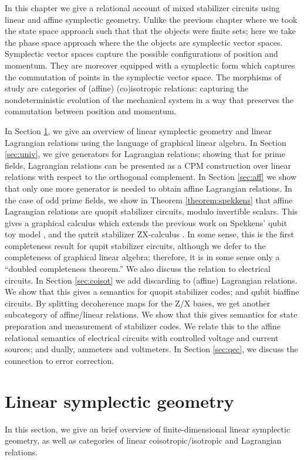 
In this chapter we  give a relational account of mixed stabilizer circuits using linear and affine symplectic geometry.
Unlike the previous chapter where we took the state space approach such that  that the objects were finite sets; here we take the phase space approach where the the objects are symplectic vector spaces.  Symplectic vector spaces capture the possible configurations of position and momentum.  They are moreover equipped with a symplectic form which captures the commutation of points in the symplectic vector space. The morphisms of study  are categories of (affine) (co)isotropic relations: capturing the nondeterministic evolution of the mechanical system in a way that preserves the commutation between position and momentum.

In Section \ref{sec:sym}, we give an overview of linear symplectic geometry and  linear Lagrangian relations using the language of graphical linear algebra. In Section \ref{sec:univ}, we give generators for Lagrangian relations; showing that for prime fields, Lagrangian relations can be presented as a CPM construction over linear relations with respect to the orthogonal complement.
In Section \ref{sec:aff} we show that only one more generator is needed to obtain affine Lagrangian relations.  In the case of odd prime fields, we show in Theorem \ref{theorem:spekkens} that affine Lagrangian relations are quopit stabilizer circuits, modulo invertible scalars.  This gives  a graphical calculus which extends the previous work on Spekkens'  qubit toy model \cite{backensspek}, and the qutrit stabilizer ZX-calculus \cite{qutrit}.  In some sense, this is the first completeness result for qupit stabilizer circuits, although we defer to the completeness of graphical linear algebra; therefore, it is in some sense only a ``doubled completeness theorem.'' We also discuss the relation to electrical circuits.
In Section \ref{sec:coisot} we add discarding to (affine) Lagrangian relations.  We show that this gives a semantics for quopit stabilizer codes; and qubit biaffine circuits.  By splitting decoherence maps for the Z/X bases, we get another subcategory of affine/linear relations.  We show that this gives semantics for state preparation and measurement of stabilizer codes. We relate this to the affine relational semantics of electrical circuits with controlled voltage and current sources; and dually, ammeters and voltmeters.  In Section \ref{sec:qec}, we discuss the connection to error correction.
\section{Linear symplectic geometry}
\label{sec:sym}
In this section, we give an brief overview of finite-dimensional linear symplectic geometry, as well as categories of linear coisotropic/isotropic and Lagrangian relations.

